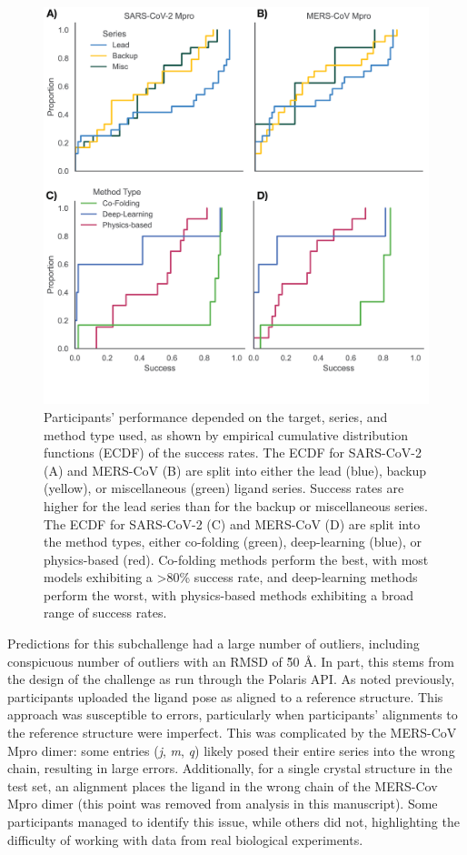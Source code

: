 \documentclass[journal=jcim,manuscript=article]{achemso}
\begin{document}
\begin{figure}
    \includegraphics[scale=1
    ]{04_figs_leaderboards/poses_by_series_and_method.png}
  \caption{Participants' performance depended on the target, series, and method type used, as shown by empirical cumulative distribution functions (ECDF) of the success rates. The ECDF for SARS-CoV-2 (A) and MERS-CoV (B) are  split into either the lead (blue), backup (yellow), or miscellaneous (green) ligand series. Success rates are higher for the lead series than for the backup or miscellaneous series. The ECDF for SARS-CoV-2 (C) and MERS-CoV (D) are  split into the method types, either co-folding (green), deep-learning (blue), or physics-based (red). Co-folding methods perform the best, with most models exhibiting a \textgreater 80\% success rate, and deep-learning methods perform the worst, with physics-based methods exhibiting a broad range of success rates.}
  \label{fgr:poses_by_series_and_method}
\end{figure}


Predictions for this subchallenge had a large number of outliers, including conspicuous number of outliers with an RMSD of \~50 Å. In part, this stems from the design of the challenge as run through the Polaris API. As noted previously, participants uploaded the ligand pose as aligned to a reference structure. This approach was susceptible to errors, particularly when participants’ alignments to the reference structure were imperfect. This was complicated by the MERS-CoV Mpro dimer: some entries (\textit{j}, \textit{m}, \textit{q}) likely posed their entire series into the wrong chain, resulting in large errors. Additionally, for a single crystal structure in the test set, an alignment places the ligand in the wrong chain of the MERS-Cov Mpro dimer (this point was removed from analysis in this manuscript). Some participants managed to identify this issue, while others did not, highlighting the difficulty of working with data from real biological experiments.
\end{document}
